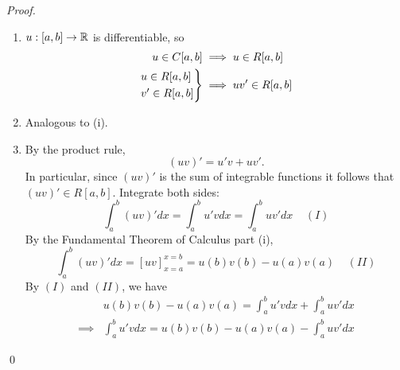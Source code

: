 \begin{proof}
    \begin{enumerate}
        \item $u:[a,b] \to \mathbb{R}$ is differentiable, so
        \begin{align*}
            u \in C[a,b] &\implies u \in R[a,b] \\
            \begin{rcases*}
                u \in R[a,b] \\
                v' \in R[a,b]
            \end{rcases*} &\implies uv' \in R[a,b]
        \end{align*}
        \item Analogous to (i).
        \item By the product rule,
        $$(uv)' = u'v + uv'.$$
        In particular, since $(uv)'$ is the sum of integrable functions it follows that $(uv)' \in R[a,b]$. Integrate both sides:
        $$\int_a^b (uv)' dx = \int_a^bu'v dx = \int_a^b uv' dx ~~~~~(I)$$
        By the Fundamental Theorem of Calculus part (i),
        $$\int_a^b (uv)' dx = [uv]_{x=a}^{x=b} = u(b)v(b) - u(a)v(a) ~~~~~(II)$$
        By $(I)$ and $(II)$, we have
        \begin{align*}
            &u(b)v(b) - u(a)v(a) = \int_a^bu'v dx + \int_a^b uv'dx \\
            \implies & \int_a^b u'vdx = u(b)v(b) - u(a)v(a) - \int_a^b uv'dx
        \end{align*}
    \end{enumerate}
    \qed
\end{proof}



